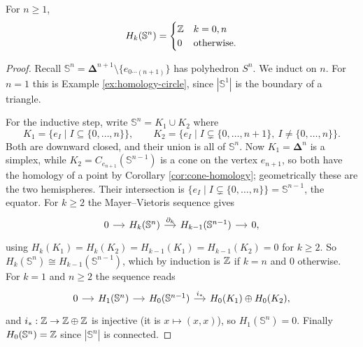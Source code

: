 \documentclass[a4paper]{scrartcl}
\newcommand{\bDelta}{\boldsymbol{\Delta}}
\newcommand{\sS}{\mathbb{S}}
\begin{document}
\begin{theorem} \label{thm:homology-spheres}
	For $n \geq 1$,
	$$
	H_k(\sS^n) = \begin{cases}\Z & k = 0, n\\ 0 & \text{otherwise.}\end{cases}
	$$
\end{theorem}
\begin{proof}
	Recall $\sS^{n} = \bDelta^{n+1}\setminus\{e_{0\cdots(n+1)}\}$ has polyhedron $S^{n}$. We induct on $n$. For $n = 1$ this is Example \ref{ex:homology-circle}, since $|\sS^1|$ is the boundary of a triangle.

	For the inductive step, write $\sS^n = K_1 \cup K_2$ where
	$$
	K_1 = \{e_I \mid I \subseteq \{0,\dots,n\}\}, \qquad K_2 = \{e_I \mid I \subsetneq \{0,\dots,n+1\}, \ I \neq \{0,\dots,n\}\}.
	$$
	Both are downward closed, and their union is all of $\sS^n$. Now $K_1 = \bDelta^n$ is a simplex, while $K_2 = C_{e_{n+1}}(\sS^{n-1})$ is a cone on the vertex $e_{n+1}$, so both have the homology of a point by Corollary \ref{cor:cone-homology}; geometrically these are the two hemispheres. Their intersection is $\{e_I \mid I \subsetneq \{0,\dots,n\}\} = \sS^{n-1}$, the equator. For $k \geq 2$ the Mayer--Vietoris sequence gives
	\[\begin{tikzcd}[column sep=small]
		0 \arrow[r] & {H_k(\sS^n)} \arrow[r, "{\partial_k}"] & {H_{k-1}(\sS^{n-1})} \arrow[r] & 0,
	\end{tikzcd}\]
	using $H_k(K_1) = H_k(K_2) = H_{k-1}(K_1) = H_{k-1}(K_2) = 0$ for $k \geq 2$. So $H_k(\sS^n)\cong H_{k-1}(\sS^{n-1})$, which by induction is $\mathbb{Z}$ if $k = n$ and $0$ otherwise. For $k = 1$ and $n \geq 2$ the sequence reads
	\[\begin{tikzcd}[column sep=small]
		0 \arrow[r] & {H_1(\sS^n)} \arrow[r] & {H_0(\sS^{n-1})} \arrow[r, "{i_*}"] & {H_0(K_1)\oplus H_0(K_2)},
	\end{tikzcd}\]
	and $i_*: \mathbb{Z} \to \mathbb{Z}\oplus\mathbb{Z}$ is injective (it is $x \mapsto (x,x)$), so $H_1(\sS^n) = 0$. Finally $H_0(\sS^n) = \Z$ since $|\sS^n|$ is connected.
\end{proof}

\begin{center}
\end{center}
\end{document}
